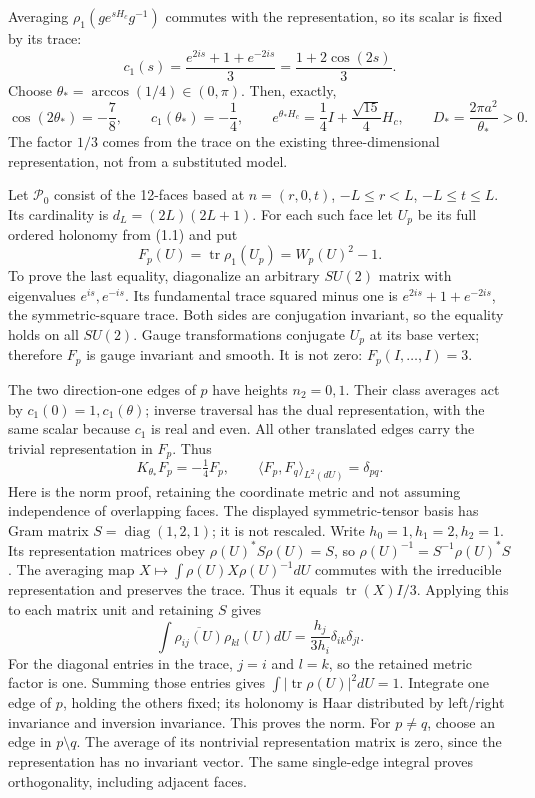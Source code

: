 \documentclass[
]{article}
\begin{document}
Averaging \(\rho_1(g e^{sH_c}g^{-1})\) commutes with the representation,
so its scalar is fixed by its trace: \[
c_1(s)=\frac{e^{2is}+1+e^{-2is}}3
       =\frac{1+2\cos(2s)}3.
\] Choose \(\theta_*=\arccos(1/4)\in(0,\pi)\). Then, exactly, \[
\cos(2\theta_*)=-\frac78,\qquad
c_1(\theta_*)=-\frac14,\qquad
e^{\theta_*H_c}=\frac14 I+\frac{\sqrt{15}}4H_c,\qquad
D_*=\frac{2\pi a^2}{\theta_*}>0.
                                                               \tag{19.16}
\] The factor \(1/3\) comes from the trace on the existing
three-dimensional representation, not from a substituted model.

Let \(\mathcal P_0\) consist of the 12-faces based at \(n=(r,0,t)\),
\(-L\le r<L\), \(-L\le t\le L\). Its cardinality is \(d_L=(2L)(2L+1)\).
For each such face let \(U_p\) be its full ordered holonomy from (1.1)
and put \[
F_p(U)=\operatorname{tr}\rho_1(U_p)=W_p(U)^2-1.
                                                               \tag{19.17}
\] To prove the last equality, diagonalize an arbitrary \(SU(2)\) matrix
with eigenvalues \(e^{is},e^{-is}\). Its fundamental trace squared minus
one is \(e^{2is}+1+e^{-2is}\), the symmetric-square trace. Both sides
are conjugation invariant, so the equality holds on all \(SU(2)\). Gauge
transformations conjugate \(U_p\) at its base vertex; therefore \(F_p\)
is gauge invariant and smooth. It is not zero: \(F_p(I,\ldots,I)=3\).

The two direction-one edges of \(p\) have heights \(n_2=0,1\). Their
class averages act by \(c_1(0)=1,c_1(\theta)\); inverse traversal has
the dual representation, with the same scalar because \(c_1\) is real
and even. All other translated edges carry the trivial representation in
\(F_p\). Thus \[
K_{\theta_*}F_p=-\tfrac14 F_p,\qquad
\langle F_p,F_q\rangle_{L^2(dU)}=\delta_{pq}.
                                                               \tag{19.18}
\] Here is the norm proof, retaining the coordinate metric and not
assuming independence of overlapping faces. The displayed
symmetric-tensor basis has Gram matrix \(S=\operatorname{diag}(1,2,1)\);
it is not rescaled. Write \(h_0=1,h_1=2,h_2=1\). Its representation
matrices obey \(\rho(U)^*S\rho(U)=S\), so
\(\rho(U)^{-1}=S^{-1}\rho(U)^*S\). The averaging map
\(X\mapsto\int\rho(U)X\rho(U)^{-1}dU\) commutes with the irreducible
representation and preserves the trace. Thus it equals
\(\operatorname{tr}(X)I/3\). Applying this to each matrix unit and
retaining \(S\) gives \[
\int\overline{\rho_{ij}(U)}\rho_{kl}(U)dU
=\frac{h_j}{3h_i}\delta_{ik}\delta_{jl}.
\] For the diagonal entries in the trace, \(j=i\) and \(l=k\), so the
retained metric factor is one. Summing those entries gives
\(\int|\operatorname{tr}\rho(U)|^2dU=1\). Integrate one edge of \(p\),
holding the others fixed; its holonomy is Haar distributed by left/right
invariance and inversion invariance. This proves the norm. For
\(p\ne q\), choose an edge in \(p\setminus q\). The average of its
nontrivial representation matrix is zero, since the representation has
no invariant vector. The same single-edge integral proves orthogonality,
including adjacent faces.
\end{document}
